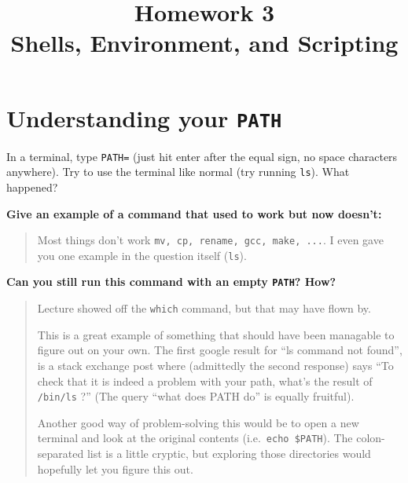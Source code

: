\documentclass{article}
\begin{document}
\fancyhead[L]{}
\fancyhead[R]{}

\fancyfoot[C]{\thepage~/~\pageref*{LastPage}}
\pagestyle{fancyplain}


\title{\textbf{Homework 3\\Shells, Environment, and Scripting}}
\author{\textbf{\color{red}{Due: Saturday, October 1, 10:00PM (Hard Deadline)}}}
\date{}
\maketitle



\section{Understanding your \texttt{PATH}}

In a terminal, type \texttt{PATH=} (just hit enter after the equal sign, no
space characters anywhere). Try to use the terminal like normal (try running
\texttt{ls}). What happened?

\textbf{Give an example of a command that used to work but now doesn't:}
\begin{quote}
  \color{violet}
  Most things don't work \texttt{mv, cp, rename, gcc, make, ...}. I even gave
  you one example in the question itself (\texttt{ls}).
\end{quote}

\textbf{Can you still run this command with an empty \texttt{PATH}? How?}
\begin{quote}
  \color{violet}
  Lecture showed off the \texttt{which} command, but that may have flown by.

  This is a great example of something that should have been managable to
  figure out on your own.
  The first google result for ``ls command not found'', is a stack exchange
  post where (admittedly the second response) says ``To check that it is
  indeed a problem with your path, what's the result of \texttt{/bin/ls} ?''
  (The query ``what does PATH do'' is equally fruitful).

  Another good way of problem-solving this would be to open a new terminal and
  look at the original contents (i.e.\ \texttt{echo \$PATH}). The
  colon-separated list is a little cryptic, but exploring those directories
  would hopefully let you figure this out.
\end{quote}
\end{document}
